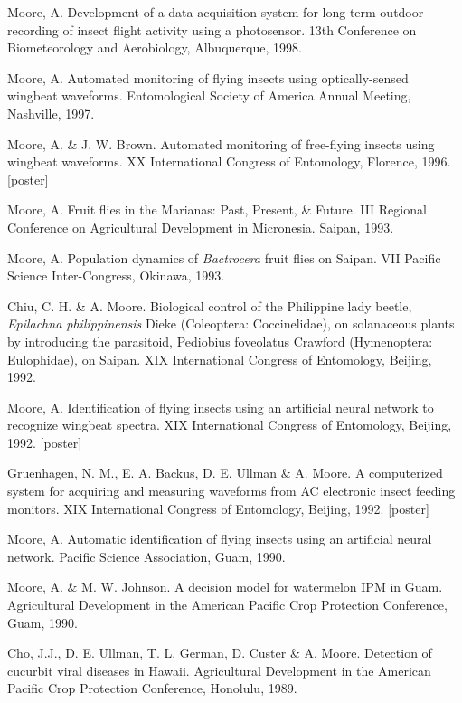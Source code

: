 \documentclass[12pt,english]{simplecv}
\begin{document}
\begin{thebibliography}{999}
Moore, A. Development of a data acquisition system
for long-term outdoor recording of insect flight activity using a
photosensor. 13th Conference on Biometeorology and Aerobiology, Albuquerque,
1998.

Moore, A. Automated monitoring of flying insects
using optically-sensed wingbeat waveforms. Entomological Society of
America Annual Meeting, Nashville, 1997. 

Moore, A. \& J. W. Brown. Automated monitoring of
free-flying insects using wingbeat waveforms. XX International Congress
of Entomology, Florence, 1996. {[}poster{]} 

Moore, A. Fruit flies in the Marianas: Past, Present,
\& Future. III Regional Conference on Agricultural Development in
Micronesia. Saipan, 1993. 

Moore, A. Population dynamics of \emph{Bactrocera}
fruit flies on Saipan. VII Pacific Science Inter-Congress, Okinawa,
1993. 

Chiu, C. H. \& A. Moore. Biological control of the
Philippine lady beetle, \emph{Epilachna philippinensis} Dieke (Coleoptera:
Coccinelidae), on solanaceous plants by introducing the parasitoid,
Pediobius foveolatus Crawford (Hymenoptera: Eulophidae), on Saipan.
XIX International Congress of Entomology, Beijing, 1992. 

Moore, A. Identification of flying insects using
an artificial neural network to recognize wingbeat spectra. XIX International
Congress of Entomology, Beijing, 1992. {[}poster{]} 

Gruenhagen, N. M., E. A. Backus, D. E. Ullman \&
A. Moore. A computerized system for acquiring and measuring waveforms
from AC electronic insect feeding monitors. XIX International Congress
of Entomology, Beijing, 1992. {[}poster{]} 

Moore, A. Automatic identification of flying insects
using an artificial neural network. Pacific Science Association, Guam,
1990. 

Moore, A. \& M. W. Johnson. A decision model for
watermelon IPM in Guam. Agricultural Development in the American Pacific
Crop Protection Conference, Guam, 1990. 

Cho, J.J., D. E. Ullman, T. L. German, D. Custer
\& A. Moore. Detection of cucurbit viral diseases in Hawaii. Agricultural
Development in the American Pacific Crop Protection Conference, Honolulu,
1989. 


\end{thebibliography}
\end{document}
